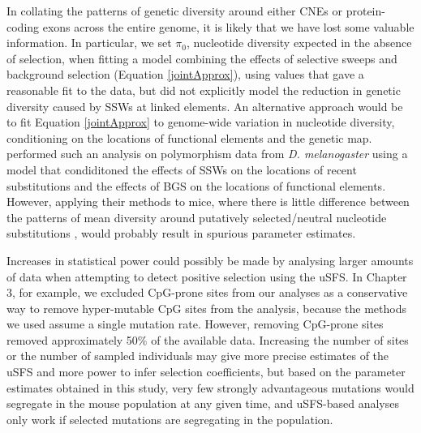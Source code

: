 {	In collating the patterns of genetic diversity around either CNEs or protein-coding exons across the entire genome, it is likely that we have lost some valuable information. In particular, we set $\pi_0$, nucleotide diversity expected in the absence of selection, when fitting a model combining the effects of selective sweeps and background selection (Equation \ref{jointApprox}), using values that gave a reasonable fit to the data, but did not explicitly model the reduction in genetic diversity caused by SSWs at linked elements.	An alternative approach would be to fit Equation \ref{jointApprox} to genome-wide variation in nucleotide diversity, conditioning on the locations of functional elements and the genetic map. \cite{RN274} performed such an analysis on polymorphism data from \textit{D. melanogaster} using a model that condiditoned the effects of SSWs on the locations of recent substitutions and the effects of BGS on the locations of functional elements. However, applying their methods to mice, where there is little difference between the patterns of mean diversity around putatively selected/neutral nucleotide substitutions \cite{RN122}, would probably result in spurious parameter estimates. 
		
	Increases in statistical power could possibly be made by analysing larger amounts of data when attempting to detect positive selection using the uSFS. In Chapter 3, for example, we excluded CpG-prone sites from our analyses as a conservative way to remove hyper-mutable CpG sites from the analysis, because the methods we used assume a single mutation rate. However, removing CpG-prone sites removed approximately 50\% of the available data. Increasing the number of sites or the number of sampled individuals may give more precise estimates of the uSFS and more power to infer selection coefficients, but based on the parameter estimates obtained in this study, very few strongly advantageous mutations would segregate in the mouse population at any given time, and uSFS-based analyses only work if selected mutations are segregating in the population. 

}

